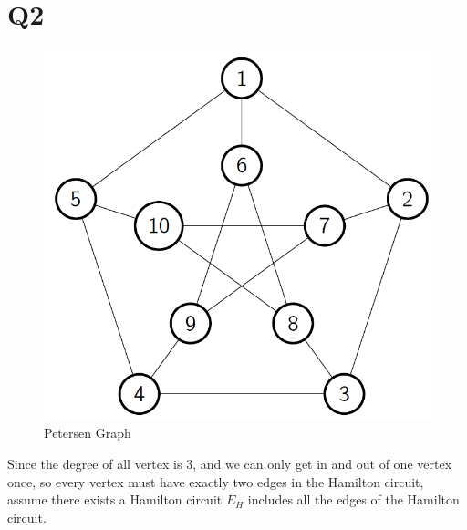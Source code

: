 \documentclass[12pt]{article}
\begin{document}
\section{Q2}
\begin{figure}[H]
\centering
\includegraphics[scale=0.3]{P1.jpg}
\caption{Petersen Graph}
\end{figure} 
Since the degree of all vertex is 3, and we can only get in and out of one vertex once, so every vertex must have exactly two edges in the Hamilton circuit, assume there exists a Hamilton circuit $E_H$ includes all the edges of the Hamilton circuit.
\end{document}
